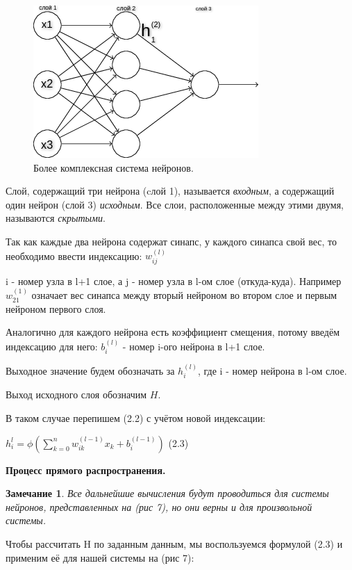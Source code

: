 \documentclass[12pt]{extarticle}
\newtheorem*{remark}{Замечание}
\begin{document}
	\begin{figure}[h]
			\centering
			\includegraphics[width=0.7\linewidth]{neuron_2.png}
			\caption{Более комплексная система нейронов.}
			\label{fig:mpr}
	\end{figure}
	
	Слой, содержащий три нейрона (cлой 1), называется \textit{входным}, а содержащий один нейрон (слой 3) \textit{исходным}. Все слои, расположенные между этими двумя, называются \textit{скрытыми}.
	
	Так как каждые два нейрона содержат синапс, у каждого синапса свой вес, то необходимо ввести индексацию: $w_{ij}^{(l)}$
	
	i - номер узла в l+1 слое, а j - номер узла в l-ом слое (откуда-куда). Например $w_{21}^{(1)}$ означает вес синапса между вторый нейроном во втором слое и первым нейроном первого слоя.
	
	Аналогично для каждого нейрона есть коэффициент смещения, потому введём индексацию для него: $b_i^{(l)}$ - номер i-ого нейрона в l+1 слое.
	
	
	Выходное значение будем обозначать за $h_i^{(l)}$, где i - номер нейрона в l-ом слое.
	
	Выход исходного слоя обозначим $H$. 
	
	В таком случае перепишем (2.2) с учётом новой индексации:
	
	\centerline{$h_i^{l} = \displaystyle\phi(\sum_{k=0}^{n}w_{ik}^{(l-1)}x_k + b_i^{(l-1)})$ (2.3)}
	
	\centerline{\textbf{Процесс прямого распространения.}}
	
	\begin{remark}
		Все дальнейшие вычисления будут проводиться для системы нейронов, представленных на (рис 7), но они верны и для произвольной системы.
	\end{remark}
	
	Чтобы рассчитать H по заданным данным, мы воспользуемся формулой (2.3) и применим её для нашей системы на (рис 7):
	
\end{document}
